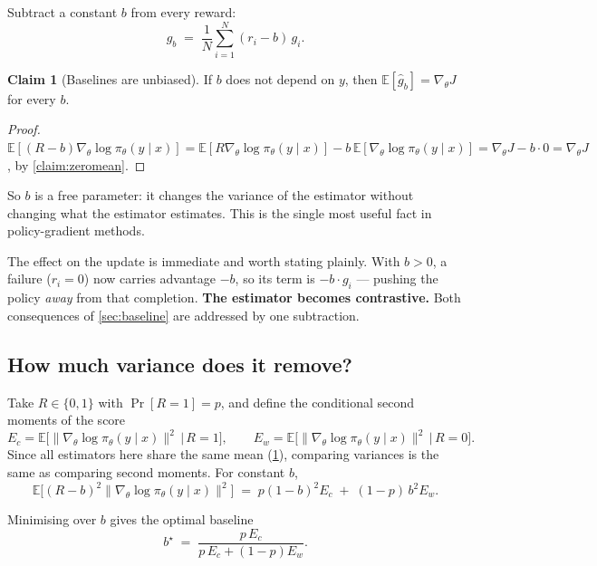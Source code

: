 \documentclass[11pt,letterpaper]{article}
\theoremstyle{definition}
\newtheorem{claim}{Claim}[section]
\newcommand{\E}{\mathbb{E}}
\newcommand{\pol}{\pi_\theta}
\newcommand{\grad}{\nabla_\theta}
\newcommand{\score}{\grad \log \pol(y \mid x)}
\newcommand{\scorei}{g_i}
\begin{document}
Subtract a constant $b$ from every reward:
\begin{equation}
  \hat{g}_b \;=\; \frac{1}{N}\sum_{i=1}^{N} (r_i - b)\, \scorei.
  \label{eq:baseline}
\end{equation}

\begin{claim}[Baselines are unbiased]
\label{claim:unbiased}
If $b$ does not depend on $y$, then $\E[\hat{g}_b] = \grad J$ for every $b$.
\end{claim}

\begin{proof}
$\E[(R - b)\score] = \E[R \score] - b\,\E[\score] = \grad J - b \cdot 0 = \grad J$, by
\cref{claim:zeromean}.
\end{proof}

So $b$ is a free parameter: it changes the variance of the estimator without changing what the
estimator estimates. This is the single most useful fact in policy-gradient methods.

The effect on the update is immediate and worth stating plainly. With $b > 0$, a failure
($r_i = 0$) now carries advantage $-b$, so its term is $-b \cdot \scorei$ --- pushing the policy
\emph{away} from that completion. \textbf{The estimator becomes contrastive.} Both consequences of
\cref{sec:baseline} are addressed by one subtraction.

\subsection{How much variance does it remove?}
\label{sec:varcalc}

Take $R \in \{0,1\}$ with $\Pr[R = 1] = p$, and define the conditional second moments of the score
\begin{equation}
  E_c = \E\big[\|\score\|^2 \,\big|\, R = 1\big], \qquad
  E_w = \E\big[\|\score\|^2 \,\big|\, R = 0\big].
\end{equation}
Since all estimators here share the same mean (\cref{claim:unbiased}), comparing variances is the
same as comparing second moments. For constant $b$,
\begin{equation}
  \E\big[(R-b)^2 \|\score\|^2\big] \;=\; p(1-b)^2 E_c \;+\; (1-p)\,b^2 E_w.
  \label{eq:secondmoment}
\end{equation}

Minimising over $b$ gives the optimal baseline
\begin{equation}
  b^\star \;=\; \frac{p\,E_c}{p\,E_c + (1-p)E_w}.
  \label{eq:optb}
\end{equation}
\end{document}
